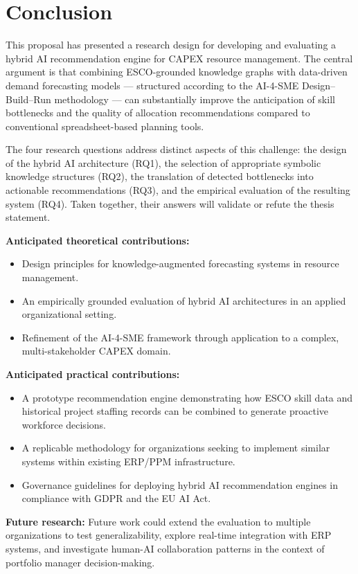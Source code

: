 \chapter{Conclusion}
\label{chap:conclusion}


This proposal has presented a research design for developing and evaluating a hybrid AI
recommendation engine for CAPEX resource management. The central argument is that combining
ESCO-grounded knowledge graphs with data-driven demand forecasting models — structured according
to the AI-4-SME Design–Build–Run methodology — can substantially improve the anticipation of
skill bottlenecks and the quality of allocation recommendations compared to conventional
spreadsheet-based planning tools.

The four research questions address distinct aspects of this challenge: the design of the hybrid
AI architecture (RQ1), the selection of appropriate symbolic knowledge structures (RQ2), the
translation of detected bottlenecks into actionable recommendations (RQ3), and the empirical
evaluation of the resulting system (RQ4). Taken together, their answers will validate or refute
the thesis statement.

\textbf{Anticipated theoretical contributions:}
\begin{itemize}
  \item Design principles for knowledge-augmented forecasting systems in resource management.
  \item An empirically grounded evaluation of hybrid AI architectures in an applied
        organizational setting.
  \item Refinement of the AI-4-SME framework through application to a complex,
        multi-stakeholder CAPEX domain.
\end{itemize}

\textbf{Anticipated practical contributions:}
\begin{itemize}
  \item A prototype recommendation engine demonstrating how ESCO skill data and historical
        project staffing records can be combined to generate proactive workforce decisions.
  \item A replicable methodology for organizations seeking to implement similar systems
        within existing ERP/PPM infrastructure.
  \item Governance guidelines for deploying hybrid AI recommendation engines in compliance
        with GDPR and the EU AI Act.
\end{itemize}

\textbf{Future research:}
Future work could extend the evaluation to multiple organizations to test generalizability,
explore real-time integration with ERP systems, and investigate human-AI collaboration patterns
in the context of portfolio manager decision-making.
